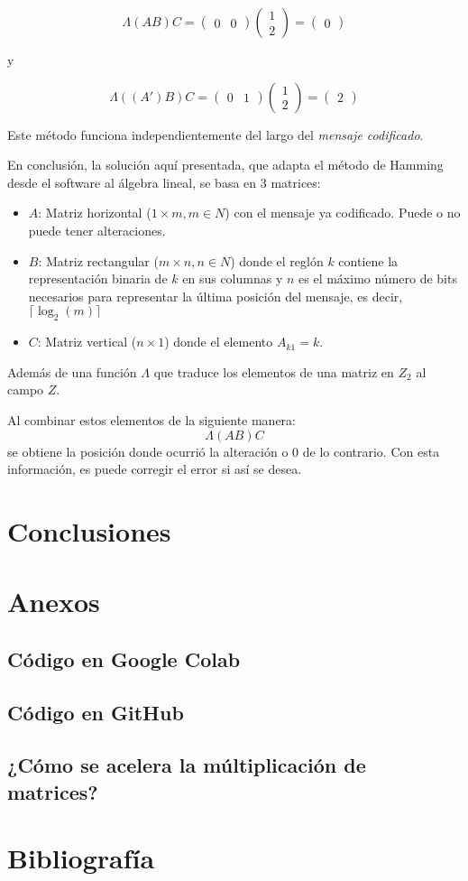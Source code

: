 \documentclass{article}
\begin{document}
$$
\Lambda(AB)C = \begin{pmatrix}
    0 & 0
\end{pmatrix}
\begin{pmatrix}
    1 \\ 2
\end{pmatrix}
= \begin{pmatrix}
    0
\end{pmatrix}
$$
\begin{center}
    y
\end{center}
$$
\Lambda((A')B)C = \begin{pmatrix}
    0 & 1
\end{pmatrix}
\begin{pmatrix}
    1 \\ 2
\end{pmatrix}
= \begin{pmatrix}
    2
\end{pmatrix}
$$

Este método funciona independientemente del largo del \textit{mensaje codificado}.

En conclusión, la solución aquí presentada, que adapta el método de Hamming desde el software al álgebra lineal, se basa en 3 matrices:
\begin{itemize}
    \item $A$: Matriz horizontal ($1 \times m, m \in N$) con el mensaje ya codificado. Puede o no puede tener alteraciones.
    \item $B$: Matriz rectangular ($m \times n, n \in N$) donde el reglón $k$ contiene la representación binaria de $k$ en sus columnas y $n$ es el máximo número de bits necesarios para representar la última posición del mensaje, es decir, $\lceil \log_2 (m) \rceil$
    \item $C$: Matriz vertical ($n \times 1$) donde el elemento $A_{k1} = k$.
\end{itemize}
Además de una función $\Lambda$ que traduce los elementos de una matriz en $Z_2$ al campo $Z$.

Al combinar estos elementos de la siguiente manera:
$$
\Lambda(AB)C
$$
se obtiene la posición donde ocurrió la alteración o $0$ de lo contrario. Con esta información, es puede corregir el error si así se desea.

\section{Conclusiones}
\section{Anexos}

\subsection{Código en Google Colab}

\subsection{Código en GitHub}

\subsection{¿Cómo se acelera la múltiplicación de matrices?}

\section{Bibliografía}
\end{document}
